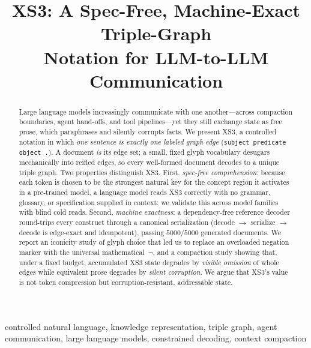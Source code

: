 \documentclass[conference]{IEEEtran}
\newcommand{\code}[1]{\texttt{#1}}
\begin{document}
\title{XS3: A Spec-Free, Machine-Exact Triple-Graph\\Notation for LLM-to-LLM Communication}

\author{
}

\maketitle

\begin{abstract}
Large language models increasingly communicate with one another---across
compaction boundaries, agent hand-offs, and tool pipelines---yet they still
exchange state as free prose, which paraphrases and silently corrupts facts.
We present XS3, a controlled notation in which \emph{one sentence is exactly one
labeled graph edge} (\code{subject predicate object .}). A document \emph{is}
its edge set; a small, fixed glyph vocabulary desugars mechanically into
reified edges, so every well-formed document decodes to a unique triple graph.
Two properties distinguish XS3. First, \emph{spec-free comprehension}: because
each token is chosen to be the strongest natural key for the concept region it
activates in a pre-trained model, a language model reads XS3 correctly with no
grammar, glossary, or specification supplied in context; we validate this across
model families with blind cold reads. Second, \emph{machine exactness}: a
dependency-free reference decoder round-trips every construct through a canonical
serialization (decode $\rightarrow$ serialize $\rightarrow$ decode is edge-exact
and idempotent), passing $5000/5000$ generated documents. We report an iconicity
study of glyph choice that led us to replace an overloaded negation marker with
the universal mathematical~$\neg$, and a compaction study showing that, under a
fixed budget, accumulated XS3 state degrades by \emph{visible omission} of whole
edges while equivalent prose degrades by \emph{silent corruption}. We argue that
XS3's value is not token compression but corruption-resistant, addressable state.
\end{abstract}

\begin{IEEEkeywords}
controlled natural language, knowledge representation, triple graph, agent
communication, large language models, constrained decoding, context compaction
\end{IEEEkeywords}
\end{document}
